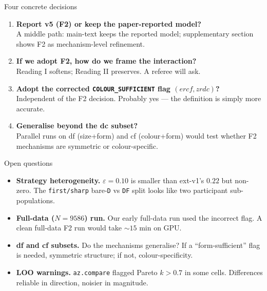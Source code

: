 \documentclass[10pt,aspectratio=169]{beamer}
\newcommand{\main}[1]{\textcolor{CSP-main-dark}{\textbf{#1}}}
\begin{document}
\begin{frame}{Four concrete decisions}
\begin{enumerate}\itemsep0.4em
  \item \main{Report v5 (F2) or keep the paper-reported model?}\\
  \small A middle path: main-text keeps the reported model; supplementary section shows F2 as mechanism-level refinement.

  \item \main{If we adopt F2, how do we frame the interaction?}\\
  \small Reading I softens; Reading II preserves. A referee will ask.

  \item \main{Adopt the corrected \texttt{COLOUR\_SUFFICIENT} flag $(ercf, zrdc)$?}\\
  \small Independent of the F2 decision. Probably yes --- the definition is simply more accurate.

  \item \main{Generalise beyond the dc subset?}\\
  \small Parallel runs on df (size+form) and cf (colour+form) would test whether F2 mechanisms are symmetric or colour-specific.
\end{enumerate}
\end{frame}

\begin{frame}{Open questions}
\small
\begin{itemize}\itemsep0.4em
  \item \main{Strategy heterogeneity.} $\varepsilon = 0.10$ is smaller than ext-v1's $0.22$ but non-zero. The \texttt{first/sharp} bare-\texttt{D} vs \texttt{DF} split looks like two participant sub-populations.
  \item \main{Full-data ($N = 9586$) run.} Our early full-data run used the incorrect flag. A clean full-data F2 run would take $\sim\!15$ min on GPU.
  \item \main{df and cf subsets.} Do the mechanisms generalise? If a ``form-sufficient'' flag is needed, symmetric structure; if not, colour-specificity.
  \item \main{LOO warnings.} \texttt{az.compare} flagged Pareto $k > 0.7$ in some cells. Differences reliable in direction, noisier in magnitude.
\end{itemize}
\end{frame}
\end{document}
